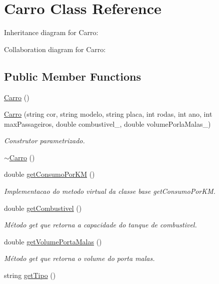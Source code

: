 \hypertarget{classCarro}{}\section{Carro Class Reference}
\label{classCarro}


Inheritance diagram for Carro\+:


Collaboration diagram for Carro\+:
\subsection*{Public Member Functions}
\begin{DoxyCompactItemize}
\item 
\hyperlink{classCarro_aa2f4235be16e1f66e4b8dfb939b403ec}{Carro} ()
\item 
\hyperlink{classCarro_aaf29ee243f81f502edf2fd7d6111d305}{Carro} (string cor, string modelo, string placa, int rodas, int ano, int max\+Passageiros, double combustivel\+\_\+, double volume\+Porla\+Malas\+\_\+)
\begin{DoxyCompactList}\small\item\em Construtor parametrizado. \end{DoxyCompactList}\item 
\hyperlink{classCarro_a7e31c4a7fba7088be8cef8b499c128bd}{$\sim$\+Carro} ()
\item 
double \hyperlink{classCarro_ac0fa548c440f6db12b86b4b3d347e5bb}{get\+Consumo\+Por\+KM} ()
\begin{DoxyCompactList}\small\item\em Implementacao do metodo virtual da classe base \textquotesingle{}get\+Consumo\+Por\+KM\textquotesingle{}. \end{DoxyCompactList}\item 
double \hyperlink{classCarro_a941a00304b070388d58a77a1c47ad7c4}{get\+Combustivel} ()
\begin{DoxyCompactList}\small\item\em Método get que retorna a capacidade do tanque de combustivel. \end{DoxyCompactList}\item 
double \hyperlink{classCarro_a9c1b5709a69b34a406f10301ab98b1c8}{get\+Volume\+Porta\+Malas} ()
\begin{DoxyCompactList}\small\item\em Método get que retorna o volume do porta malas. \end{DoxyCompactList}\item 
string \hyperlink{classCarro_a98987e2932fe7ee4051b426b74c7d9cc}{get\+Tipo} ()

\end{DoxyCompactItemize}
